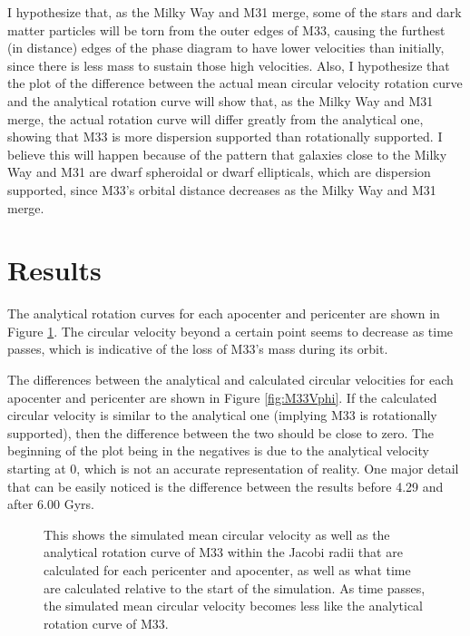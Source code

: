 \documentclass[trackchanges, twocolumn]{aastex7}
\begin{document}
I hypothesize that, as the Milky Way and M31 merge, some of the stars and dark matter particles will be torn from the outer edges of M33, causing the furthest (in distance) edges of the phase diagram to have lower velocities than initially, since there is less mass to sustain those high velocities. Also, I hypothesize that the plot of the difference between the actual mean circular velocity rotation curve and the analytical rotation curve will show that, as the Milky Way and M31 merge, the actual rotation curve will differ greatly from the analytical one, showing that M33 is more dispersion supported than rotationally supported. I believe this will happen because of the pattern that galaxies close to the Milky Way and M31 are dwarf spheroidal or dwarf ellipticals, which are dispersion supported, since M33's orbital distance decreases as the Milky Way and M31 merge.

\section{Results}

The analytical rotation curves for each apocenter and pericenter are shown in Figure \ref{fig:M33Rot}. The circular velocity beyond a certain point seems to decrease as time passes, which is indicative of the loss of M33's mass during its orbit.

The differences between the analytical and calculated circular velocities for each apocenter and pericenter are shown in Figure \ref{fig:M33Vphi}. If the calculated circular velocity is similar to the analytical one (implying M33 is rotationally supported), then the difference between the two should be close to zero. The beginning of the plot being in the negatives is due to the analytical velocity starting at 0, which is not an accurate representation of reality. One major detail that can be easily noticed is the difference  between the results before 4.29 and after 6.00 Gyrs.

\begin{figure}[ht!]
\caption{ This shows the simulated mean circular velocity as well as the analytical rotation curve of M33 within the Jacobi radii that are calculated for each pericenter and apocenter, as well as what time are calculated relative to the start of the simulation. As time passes, the simulated mean circular velocity becomes less like the analytical rotation curve of M33.
\label{fig:M33Rot}}
\end{figure}
\end{document}
